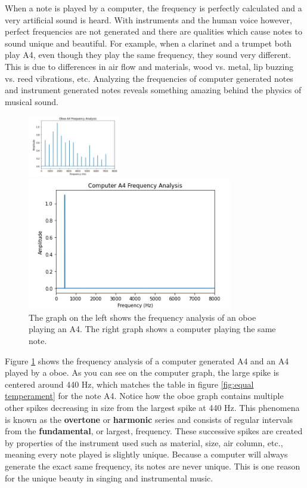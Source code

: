 \documentclass[10pt]{article}
\begin{document}
When a note is played by a computer, the frequency is perfectly calculated and a very artificial sound is heard. With instruments and the human voice however, perfect frequencies are not generated and there are qualities which cause notes to sound unique and beautiful. For example, when a clarinet and a trumpet both play A4, even though they play the same frequency, they sound very different. This is due to differences in air flow and materials, wood vs. metal, lip buzzing vs. reed vibrations, etc. Analyzing the frequencies of computer generated notes and instrument generated notes reveals something amazing behind the physics of musical sound.

\begin{figure}[H]
    \centering
    \parbox{3in}{\includegraphics[width=0.36\textwidth]{OboeA4Freq.jpg}}
    \begin{minipage}{3in}
        \includegraphics[width=0.8\textwidth]{CompA4Freq.jpg}
    \end{minipage}
    \caption{The graph on the left shows the frequency analysis of an oboe playing an A4. The right graph shows a computer playing the same note.}%
    \label{fig:computer vs. oboe}%
\end{figure}

Figure \ref{fig:computer vs. oboe} shows the frequency analysis of a computer generated A4 and an A4 played by a oboe. As you can see on the computer graph, the large spike is centered around 440 Hz, which matches the table in figure \ref{fig:equal temperament} for the note A4. Notice how the oboe graph contains multiple other spikes decreasing in size from the largest spike at 440 Hz. This phenomena is known as the \textbf{overtone} or \textbf{harmonic} series and consists of regular intervals from the \textbf{fundamental}, or largest, frequency. These successive spikes are created by properties of the instrument used such as material, size, air column, etc., meaning every note played is slightly unique. Because a computer will always generate the exact same frequency, its notes are never unique. This is one reason for the unique beauty in singing and instrumental music.
\end{document}
